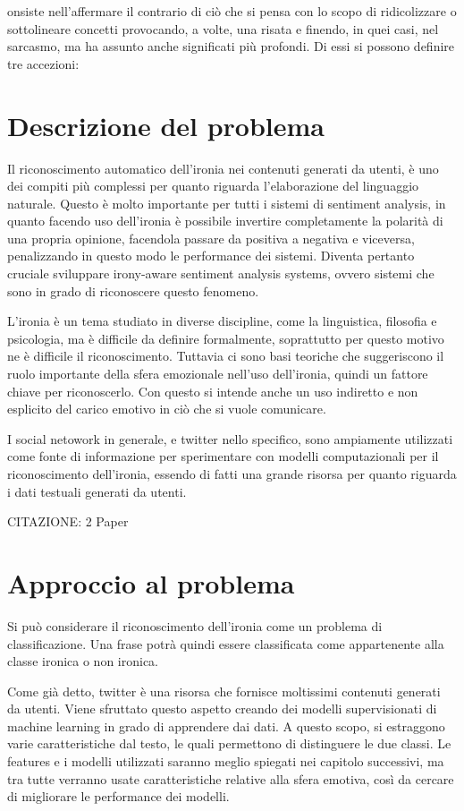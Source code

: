 \documentclass[oneside]{book}
\begin{document}
onsiste nell'affermare il contrario di ciò che si pensa con lo scopo di ridicolizzare o sottolineare concetti provocando, a volte, una risata e finendo, in quei casi, nel sarcasmo, ma ha assunto anche significati più profondi. Di essi si possono definire tre accezioni:


\section*{Descrizione del problema}
Il riconoscimento automatico dell'ironia nei contenuti generati da utenti, è uno dei compiti più complessi per quanto riguarda l'elaborazione del linguaggio naturale.
Questo è molto importante per tutti i sistemi di sentiment analysis, in quanto facendo uso dell'ironia è possibile invertire completamente la polarità di una propria opinione, facendola passare da positiva a negativa e viceversa, penalizzando in questo modo le performance dei sistemi.
Diventa pertanto cruciale sviluppare irony-aware sentiment analysis systems, ovvero sistemi che sono in grado di riconoscere questo fenomeno.

L'ironia è un tema studiato in diverse discipline, come la linguistica, filosofia e psicologia, ma è difficile da definire formalmente, soprattutto per questo motivo ne è difficile il riconoscimento. Tuttavia ci sono basi teoriche che suggeriscono il ruolo importante della sfera emozionale nell'uso dell'ironia, quindi un fattore chiave per riconoscerlo. Con questo si intende anche un uso indiretto e non esplicito del carico emotivo in ciò che si vuole comunicare.

I social netowork in generale, e twitter nello specifico, sono ampiamente utilizzati come fonte di informazione per sperimentare con modelli computazionali per il riconoscimento dell'ironia, essendo di fatti una grande risorsa per quanto riguarda i dati testuali generati da utenti.



CITAZIONE: 2 Paper 

\section*{Approccio al problema}
Si può considerare il riconoscimento dell'ironia come un problema di classificazione. Una frase potrà quindi essere classificata come appartenente alla classe ironica o non ironica.

Come già detto, twitter è una risorsa che fornisce moltissimi contenuti generati da utenti. Viene sfruttato questo aspetto creando dei modelli supervisionati di machine learning in grado di apprendere dai dati. A questo scopo, si estraggono varie caratteristiche dal testo, le quali permettono di distinguere le due classi.
Le features e i modelli utilizzati saranno meglio spiegati nei capitolo successivi, ma tra tutte verranno usate caratteristiche relative alla sfera emotiva, così da cercare di migliorare le performance dei modelli.
\end{document}
